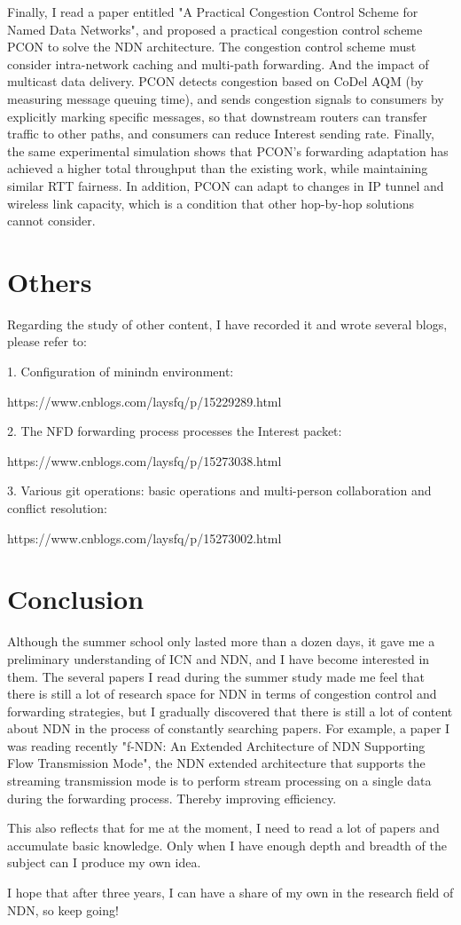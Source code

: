 \documentclass[conference]{IEEEtran}
\begin{document}
Finally, I read a paper entitled "A Practical Congestion Control Scheme for Named Data Networks", 
and proposed a practical congestion control scheme PCON to solve the NDN architecture. 
The congestion control scheme must consider intra-network caching and multi-path forwarding. 
And the impact of multicast data delivery. PCON detects congestion based on 
CoDel AQM (by measuring message queuing time), and sends congestion signals to 
consumers by explicitly marking specific messages, so that downstream routers 
can transfer traffic to other paths, and consumers can reduce Interest sending rate. 
Finally, the same experimental simulation shows that PCON's forwarding adaptation 
has achieved a higher total throughput than the existing work, while maintaining similar RTT fairness. 
In addition, PCON can adapt to changes in IP tunnel and wireless link capacity, which is a condition 
that other hop-by-hop solutions cannot consider.

\section{Others}
Regarding the study of other content, I have recorded it and wrote several blogs, please refer to:


1. Configuration of minindn environment:


https://www.cnblogs.com/laysfq/p/15229289.html




2. The NFD forwarding process processes the Interest packet:


https://www.cnblogs.com/laysfq/p/15273038.html




3. Various git operations: basic operations and multi-person collaboration and conflict resolution:


https://www.cnblogs.com/laysfq/p/15273002.html

\section{Conclusion}
Although the summer school only lasted more than a dozen days, it gave me a preliminary understanding of ICN and NDN, and I have become interested in them. The several papers I read during the summer study made me feel that there is still a lot of research space for NDN in terms of congestion control and forwarding strategies, but I gradually discovered that there is still a lot of content about NDN in the process of constantly searching papers. For example, a paper I was reading recently "f-NDN: An Extended Architecture of NDN Supporting Flow Transmission Mode", the NDN extended architecture that supports the streaming transmission mode is to perform stream processing on a single data during the forwarding process. Thereby improving efficiency.


This also reflects that for me at the moment, I need to read a lot of papers and accumulate basic knowledge. Only when I have enough depth and breadth of the subject can I produce my own idea.


I hope that after three years, I can have a share of my own in the research field of NDN, so keep going!
\end{document}
